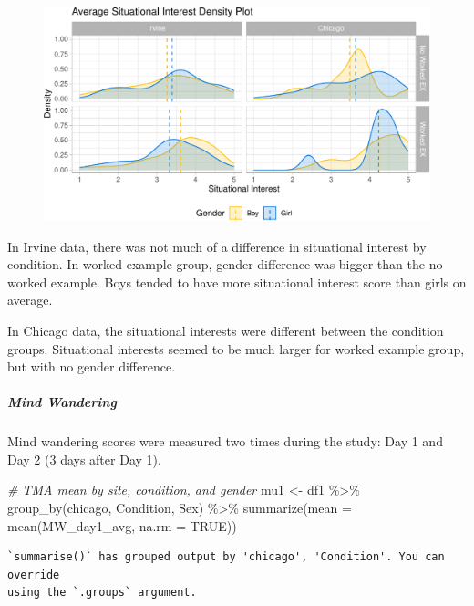 \documentclass[
  letterpaper,
  DIV=11,
  numbers=noendperiod]{scrartcl}
\let\oldsubparagraph\subparagraph
\renewcommand{\subparagraph}[1]{\oldsubparagraph{#1}\mbox{}}
\newenvironment{Shaded}{\begin{snugshade}}{\end{snugshade}}
\newcommand{\AttributeTok}[1]{\textcolor[rgb]{0.49,0.56,0.16}{#1}}
\newcommand{\CommentTok}[1]{\textcolor[rgb]{0.38,0.63,0.69}{\textit{#1}}}
\newcommand{\ConstantTok}[1]{\textcolor[rgb]{0.53,0.00,0.00}{#1}}
\newcommand{\FunctionTok}[1]{\textcolor[rgb]{0.02,0.16,0.49}{#1}}
\newcommand{\NormalTok}[1]{\textcolor[rgb]{0.00,0.44,0.13}{#1}}
\newcommand{\OtherTok}[1]{\textcolor[rgb]{0.00,0.44,0.13}{#1}}
\newcommand{\SpecialCharTok}[1]{\textcolor[rgb]{0.25,0.44,0.63}{#1}}
\begin{document}
\begin{figure}[H]

{\centering \includegraphics{sampling_files/figure-pdf/unnamed-chunk-15-1.pdf}

}

\end{figure}

In Irvine data, there was not much of a difference in situational
interest by condition. In worked example group, gender difference was
bigger than the no worked example. Boys tended to have more situational
interest score than girls on average.

In Chicago data, the situational interests were different between the
condition groups. Situational interests seemed to be much larger for
worked example group, but with no gender difference.

\hypertarget{mind-wandering}{%
\subparagraph{Mind Wandering}\label{mind-wandering}}

Mind wandering scores were measured two times during the study: Day 1
and Day 2 (3 days after Day 1).

\begin{Shaded}
\begin{Highlighting}[]
\CommentTok{\# TMA mean by site, condition, and gender}
\NormalTok{mu1 }\OtherTok{\textless{}{-}}\NormalTok{ df1 }\SpecialCharTok{\%\textgreater{}\%} \FunctionTok{group\_by}\NormalTok{(chicago, Condition, Sex) }\SpecialCharTok{\%\textgreater{}\%} \FunctionTok{summarize}\NormalTok{(}\AttributeTok{mean =} \FunctionTok{mean}\NormalTok{(MW\_day1\_avg, }\AttributeTok{na.rm =} \ConstantTok{TRUE}\NormalTok{))}
\end{Highlighting}
\end{Shaded}

\begin{verbatim}
`summarise()` has grouped output by 'chicago', 'Condition'. You can override
using the `.groups` argument.
\end{verbatim}
\end{document}
